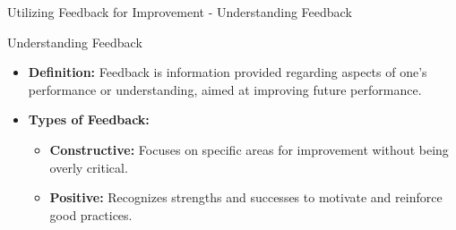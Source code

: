 \documentclass[aspectratio=169]{beamer}
\begin{document}
\begin{frame}[fragile]{Utilizing Feedback for Improvement - Understanding Feedback}
    \begin{block}{Understanding Feedback}
        \begin{itemize}
            \item \textbf{Definition:} Feedback is information provided regarding aspects of one's performance or understanding, aimed at improving future performance.
            \item \textbf{Types of Feedback:}
                \begin{itemize}
                    \item \textbf{Constructive:} Focuses on specific areas for improvement without being overly critical.
                    \item \textbf{Positive:} Recognizes strengths and successes to motivate and reinforce good practices.
                \end{itemize}
        \end{itemize}
    \end{block}
\end{frame}
\end{document}
